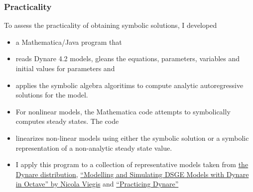 \documentclass[tikz]{beamer}
\begin{document}
  \begin{frame}
    \frametitle{Practicality}
    To assess the practicality of obtaining symbolic solutions, I developed
    \begin{itemize}
    \item a Mathematica/Java program that
    \item reads  Dynare 4.2 models, gleans the equations,  parameters, 
variables and   initial values for parameters and
\item 
applies the symbolic algebra algoritims to compute analytic 
autoregressive solutions for the model.
\item For nonlinear models, the Mathematica  code attempts to symbolically computes 
steady states. The code
\item linearizes non-linear models using either the symbolic solution or a 
symbolic representation of a non-analytic steady state value.
\end{itemize}
\end{frame}
\begin{frame}
\begin{itemize}
\item I apply this program to a collection of representative models taken from 
\href{http://www.dynare.org/documentation-and-support/faq/basics}{the Dynare distribution,}
\href{http://www.nviegi.net/research/dsge.htm}{``Modelling and Simulating DSGE Models with Dynare in Octave'' by Nicola Viegis} and 
\href{http://homepages.nyu.edu/~ts43/research/AP_tom16.pdf}{``Practicing Dynare''\cite{bhandari10}}
    \end{itemize}
  \end{frame}




\end{document}
